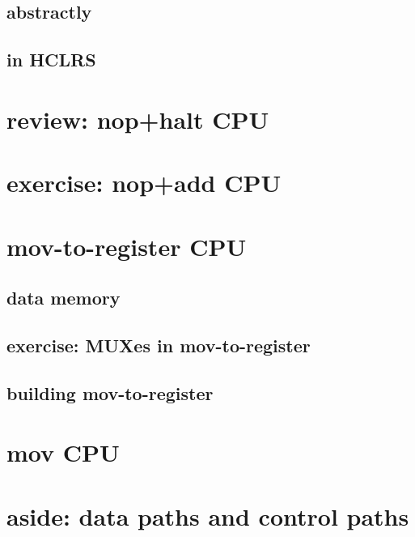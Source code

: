 \subsection{abstractly}


\subsection{in HCLRS}



\section{review: nop+halt CPU}

\section{exercise: nop+add CPU}

\section{mov-to-register CPU}



\subsection{data memory}


\subsection{exercise: MUXes in mov-to-register}


\subsection{building mov-to-register}


\section{mov CPU}


\section{aside: data paths and control paths}



